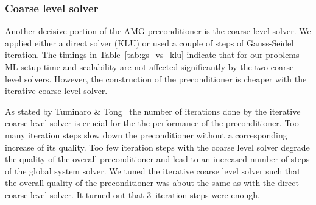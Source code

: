 
\subsubsection*{Coarse level solver}

Another decisive portion of the AMG preconditioner is the coarse level
solver.  We applied either a direct solver (KLU) or used a couple of
steps of Gauss-Seidel iteration.  The timings in
Table~\ref{tab:gs_vs_klu} indicate that for our problems ML setup time
and scalability are not affected significantly by the two coarse level
solvers.  However, the construction of the preconditioner is cheaper
with the iterative coarse level solver.  

As stated by Tuminaro \& Tong~\cite{tuto:00} the number of iterations
done by the iterative coarse level solver is crucial for the the
performance of the preconditioner.  Too many iteration steps slow down
the preconditioner without a corresponding increase of its quality.  Too
few iteration steps with the coarse level solver degrade the quality of
the overall preconditioner and lead to an increased number of steps of
the global system solver.  We tuned the iterative coarse level solver
such that the overall quality of the preconditioner was about the same
as with the direct coarse level solver.  It turned out that 3~iteration
steps were enough.


